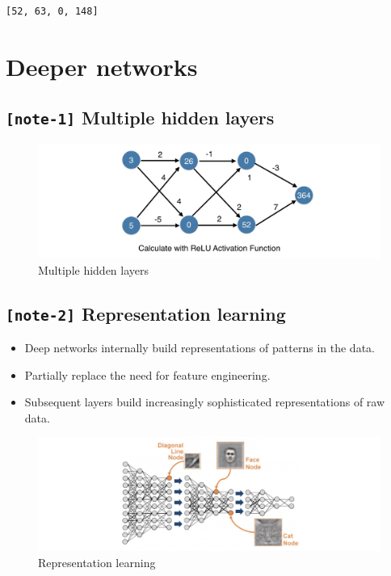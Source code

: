 \documentclass[11pt, twoside]{article}
\begin{document}
    \begin{Verbatim}[commandchars=\\\{\}]
[52, 63, 0, 148]
    \end{Verbatim}

    \hypertarget{deeper-networks}{%
\section{Deeper networks}\label{deeper-networks}}

    \hypertarget{note-1-multiple-hidden-layers}{%
\subsection{\texorpdfstring{\texttt{{[}note-1{]}} Multiple hidden
layers}{{[}note-1{]} Multiple hidden layers}}\label{note-1-multiple-hidden-layers}}

\begin{figure}
\centering
\includegraphics{../Figures/9. Multiple hidden layers.jpg}
\caption{Multiple hidden layers}
\end{figure}

    \hypertarget{note-2-representation-learning}{%
\subsection{\texorpdfstring{\texttt{{[}note-2{]}} Representation
learning}{{[}note-2{]} Representation learning}}\label{note-2-representation-learning}}

\begin{itemize}
\item
  Deep networks internally build representations of patterns in the
  data.
\item
  Partially replace the need for feature engineering.
\item
  Subsequent layers build increasingly sophisticated representations of
  raw data.
\end{itemize}

\begin{figure}
\centering
\includegraphics{../Figures/10. Representation learning.jpg}
\caption{Representation learning}
\end{figure}
\end{document}
